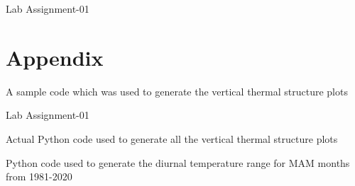 \documentclass[10pt, a4paper]{article}
\begin{document}
\newpage
Lab Assignment-01


\section{Appendix}

A sample code which was used to generate the vertical thermal structure plots



\newpage
Lab Assignment-01
\vspace{1cm}

Actual Python code used to generate all the vertical thermal structure plots 


\vspace{1cm}
\hline
\vspace{1cm}

Python code used to generate the diurnal temperature range for MAM months from 1981-2020






\end{document}
